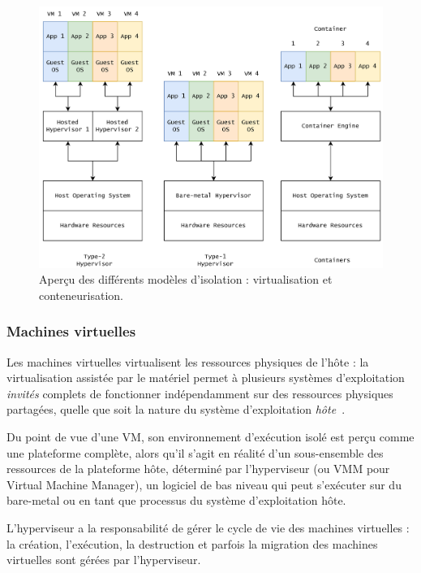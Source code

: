 \begin{figure}[htbp]
    \centering
	\includegraphics[width=\textwidth]{3_Chapitre1/figures/virtualization.png}
	\caption{Aperçu des différents modèles d'isolation : virtualisation et conteneurisation.}
	\label{fig:virtualization}
\end{figure}

\subsubsection{Machines virtuelles}

Les machines virtuelles virtualisent les ressources physiques de l'hôte : la virtualisation assistée par le matériel permet à plusieurs systèmes d'exploitation \textit{invités} complets de fonctionner indépendamment sur des ressources physiques partagées, quelle que soit la nature du système d'exploitation \textit{hôte}~\cite{kivityKvmLinuxVirtual}.

Du point de vue d'une VM, son environnement d'exécution isolé est perçu comme une plateforme complète, alors qu'il s'agit en réalité d'un sous-ensemble des ressources de la plateforme hôte, déterminé par l'hyperviseur (ou VMM pour Virtual Machine Manager), un logiciel de bas niveau qui peut s'exécuter sur du bare-metal ou en tant que processus du système d'exploitation hôte.

L'hyperviseur a la responsabilité de gérer le cycle de vie des machines virtuelles : la création, l'exécution, la destruction et parfois la migration des machines virtuelles sont gérées par l'hyperviseur.

